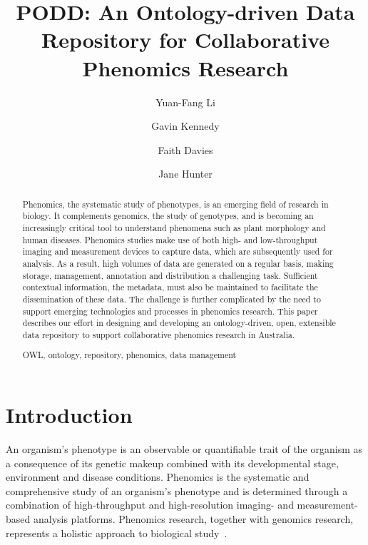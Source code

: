\documentclass{llncs}
\def\keywordname{{\textbf{Keyword:}}}
\newcommand{\keywords}[1]{\par\addvspace\baselineskip
\noindent\keywordname\enspace\ignorespaces#1}
\begin{document}
\mainmatter  %

\title{PODD: An Ontology-driven Data Repository for Collaborative Phenomics Research}

\author{Yuan-Fang Li \and Gavin Kennedy \and Faith Davies \and Jane Hunter}


\maketitle

\begin{abstract}
Phenomics, the systematic study of phenotypes, is an emerging field
of research in biology. It complements genomics, the study of
genotypes, and is becoming an increasingly critical tool to
understand phenomena such as plant morphology and human diseases.
Phenomics studies make use of both high- and low-throughput imaging
and measurement devices to capture data, which are subsequently used
for analysis. As a result, high volumes of data are generated on a
regular basis, making storage, management, annotation and
distribution a challenging task. Sufficient contextual information,
the metadata, must also be maintained to facilitate the
dissemination of these data. The challenge is further complicated by
the need to support emerging technologies and processes in phenomics
research. This paper describes our effort in designing and
developing an ontology-driven, open, extensible data repository to
support collaborative phenomics research in Australia.

\keywords{OWL, ontology, repository, phenomics, data management}
\end{abstract}

\section{Introduction}\label{sec:intro}
An organism's phenotype is an observable or quantifiable trait of
the organism as a consequence of its genetic makeup combined with
its developmental stage, environment and disease conditions.
Phenomics is the systematic and comprehensive study of an organism's
phenotype and is determined through a combination of high-throughput
and high-resolution imaging- and measurement-based analysis
platforms. Phenomics research, together with genomics research,
represents a holistic approach to biological
study~\cite{dhoule09,Sauer200458,nevo01}.
\end{document}
